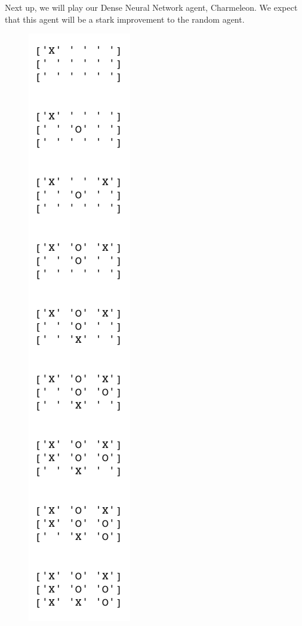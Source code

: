 Next up, we will play our Dense Neural Network agent, Charmeleon.
We expect that this agent will be a stark improvement to the random agent.

\begin{figure}[H]
	\centering
	\includegraphics[scale=.5]{h_v_dense}
\end{figure}

